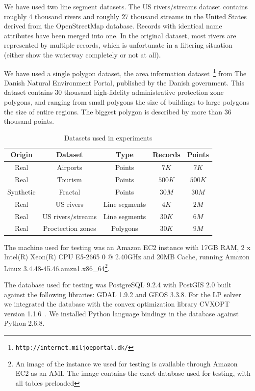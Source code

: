 We have used two line segment datasets. The US rivers/streams dataset contains roughly 4 thousand rivers and roughly 27 thousand streams in the United States derived from the OpenStreetMap database. Records with identical name attributes have been merged into one. In the original dataset, most rivers are represented by multiple records, which is unfortunate in a filtering situation (either show the waterway completely or not at all). 

We have used a single polygon dataset, the area information dataset~\footnote{\texttt{http://internet.miljoeportal.dk/}} from The Danish Natural Environment Portal, published by the Danish government. This dataset contains 30 thousand high-fidelity administrative protection zone polygons, and ranging from small polygons the size of buildings to large polygons the size of entire regions. The biggest polygon is described by more than 36 thousand points.

\begin{table}[htdp]
\caption{Datasets used in experiments}
\label{tab:datasets}
\begin{center}
\begin{tabular}{|c|c|c|c|c|}
\hline
\textbf{Origin} & \textbf{Dataset} & \textbf{Type} & \textbf{Records} & \textbf{Points} \\
\hline
Real & Airports & Points & $7K$ & $7K$ \\
Real & Tourism & Points & $500K$ & $500K$ \\
Synthetic & Fractal & Points & $30M$ & $30M$ \\
Real & US rivers & Line segments & $4K$ & $2M$ \\
Real & US rivers/streams & Line segments & $30K$ & $6M$ \\
Real & Proctection zones & Polygons & $30K$ & $9M$ \\
\hline
\end{tabular}
\end{center}
\label{default}
\end{table}%


The machine used for testing was an Amazon EC2 instance with 17GB RAM, 2 x Intel(R) Xeon(R) CPU E5-2665 0 @ 2.40GHz and 20MB Cache, running Amazon Linux 3.4.48-45.46.amzn1.x86\_64\footnote{An image of the instance we used for testing is available through Amazon EC2 as an AMI. The image contains the exact database used for testing, with all tables preloaded}.

The database used for testing was PostgreSQL 9.2.4 with PostGIS  2.0 built against the following libraries: GDAL 1.9.2 and GEOS 3.3.8. For the LP solver we integrated the database with the convex optimization library CVXOPT version 1.1.6~\cite{cvxopt}. We installed Python language bindings in the database against Python 2.6.8.

